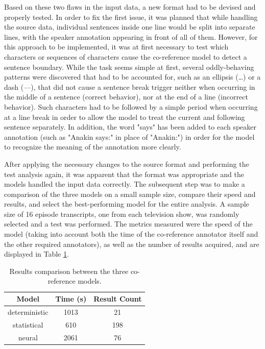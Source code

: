 \documentclass[a4paper, 11pt]{article}
\begin{document}
Based on these two flaws in the input data, a new format had to be devised and properly tested. In order to fix the first issue, it was planned that while handling the source data, individual sentences inside one line would be split into separate lines, with the speaker annotation appearing in front of all of them. However, for this approach to be implemented, it was at first necessary to test which characters or sequences of characters cause the co-reference model to detect a sentence boundary. While the task seems simple at first, several oddly-behaving patterns were discovered that had to be accounted for, such as an ellipsis (…) or a dash (—), that did not cause a sentence break trigger neither when occurring in the middle of a sentence (correct behavior), nor at the end of a line (incorrect behavior). Such characters had to be followed by a simple period when occurring at a line break in order to allow the model to treat the current and following sentence separately. In addition, the word "says" has been added to each speaker annotation (such as "Anakin says:" in place of "Anakin:") in order for the model to recognize the meaning of the annotation more clearly.

After applying the necessary changes to the source format and performing the test analysis again, it was apparent that the format was appropriate and the models handled the input data correctly. The subsequent step was to make a comparison of the three models on a small sample size, compare their speed and results, and select the best-performing model for the entire analysis. A sample size of 16 episode transcripts, one from each television show, was randomly selected and a test was performed. The metrics measured were the speed of the model (taking into account both the time of the co-reference annotator itself and the other required annotators), as well as the number of results acquired, and are displayed in Table \ref{tab:compmod}.

\begin{table}[h!]
\centering
  \begin{small}
  \begin{tabular}{|| c | c | c ||}
  \hline
  Model & Time (s) & Result Count \\
  \hline\hline
  deterministic & 1013 & 21 \\
  \hline
  statistical & 610 & 198 \\
  \hline
  neural & 2061 & 76 \\
  \hline
  \end{tabular}
  \end{small}
  \caption{Results comparison between the three co-reference models.}
  \label{tab:compmod}
\end{table}
\end{document}
